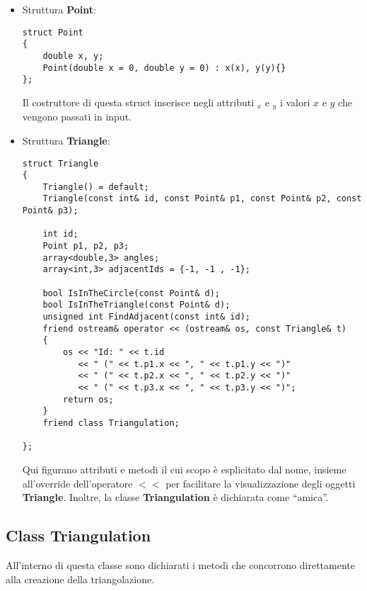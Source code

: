 \documentclass{article}
\begin{document}
\begin{itemize}

\item  Struttura \textbf{Point}:
\begin{lstlisting}
struct Point
{
    double x, y;
    Point(double x = 0, double y = 0) : x(x), y(y){}
};
\end{lstlisting}
Il costruttore di questa struct inserisce negli attributi $_x$ e $_y$ i valori $x$ e $y$ che vengono passati in input.\\

\item Struttura \textbf{Triangle}:
\begin{lstlisting}
struct Triangle
{
    Triangle() = default;
    Triangle(const int& id, const Point& p1, const Point& p2, const Point& p3);

    int id;
    Point p1, p2, p3;
    array<double,3> angles;
    array<int,3> adjacentIds = {-1, -1 , -1};

    bool IsInTheCircle(const Point& d);
    bool IsInTheTriangle(const Point& d);
    unsigned int FindAdjacent(const int& id);
    friend ostream& operator << (ostream& os, const Triangle& t)
    {
        os << "Id: " << t.id
           << " (" << t.p1.x << ", " << t.p1.y << ")"
           << " (" << t.p2.x << ", " << t.p2.y << ")"
           << " (" << t.p3.x << ", " << t.p3.y << ")";
        return os;
    }
    friend class Triangulation;

};
\end{lstlisting}
Qui figurano attributi e metodi il cui scopo è esplicitato dal nome,  insieme all'override dell'operatore $<<$ per facilitare la visualizzazione degli oggetti \textbf{Triangle}.  Inoltre,  la classe \textbf{Triangulation} è dichiarata come \enquote{amica}.
\end{itemize}

\subsection{Class Triangulation}
All'interno di questa classe sono dichiarati i metodi che concorrono direttamente alla creazione della triangolazione.
\end{document}
